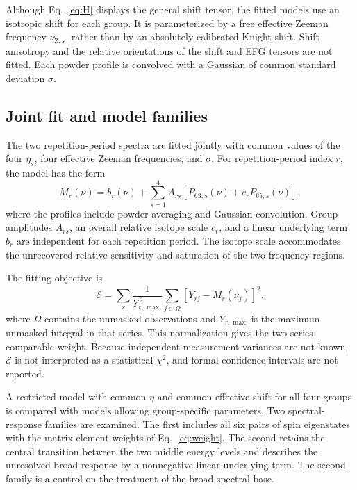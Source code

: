 \documentclass[10pt,a4paper,twocolumn]{article}
\begin{document}
Although Eq.~\eqref{eq:H} displays the general shift tensor, the fitted models use an isotropic shift for each group. It is parameterized by a free effective Zeeman frequency $\nu_{\mathrm Z,s}$, rather than by an absolutely calibrated Knight shift. Shift anisotropy and the relative orientations of the shift and EFG tensors are not fitted. Each powder profile is convolved with a Gaussian of common standard deviation $\sigma$.

\subsection{Joint fit and model families}

The two repetition-period spectra are fitted jointly with common values of the four $\eta_s$, four effective Zeeman frequencies, and $\sigma$. For repetition-period index $r$, the model has the form
\begin{equation}
M_r(\nu)=b_r(\nu)+
\sum_{s=1}^{4} A_{rs}
\left[P_{63,s}(\nu)+c_rP_{65,s}(\nu)\right],
\label{eq:mixture}
\end{equation}
where the profiles include powder averaging and Gaussian convolution. Group amplitudes $A_{rs}$, an overall relative isotope scale $c_r$, and a linear underlying term $b_r$ are independent for each repetition period. The isotope scale accommodates the unrecovered relative sensitivity and saturation of the two frequency regions.

The fitting objective is
\begin{equation}
\mathcal E=
\sum_r \frac{1}{Y_{r,\max}^{\,2}}
\sum_{j\in\Omega}
\left[Y_{rj}-M_r(\nu_j)\right]^2,
\label{eq:objective}
\end{equation}
where $\Omega$ contains the unmasked observations and $Y_{r,\max}$ is the maximum unmasked integral in that series. This normalization gives the two series comparable weight. Because independent measurement variances are not known, $\mathcal E$ is not interpreted as a statistical $\chi^2$, and formal confidence intervals are not reported.

A restricted model with common $\eta$ and common effective shift for all four groups is compared with models allowing group-specific parameters. Two spectral-response families are examined. The first includes all six pairs of spin eigenstates with the matrix-element weights of Eq.~\eqref{eq:weight}. The second retains the central transition between the two middle energy levels and describes the unresolved broad response by a nonnegative linear underlying term. The second family is a control on the treatment of the broad spectral base.
\end{document}
